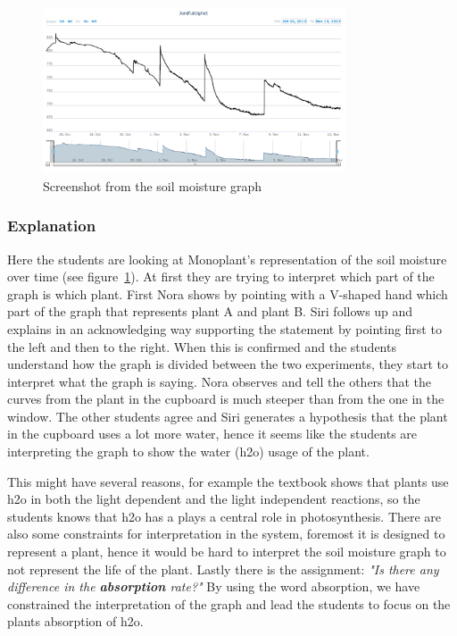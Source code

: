 \begin{figure}
	\centering
	\includegraphics[width=0.8\textwidth]{img/dataandanalasys/soilmoisturegraph.png}
	\caption{Screenshot from the soil moisture graph}
	\label{fig:soilmoistscreenshot}
\end{figure}

\subsubsection*{Explanation}
Here the students are looking at Monoplant's representation of the soil moisture over time (see figure~\ref{fig:soilmoistscreenshot}). At first they are trying to interpret which part of the graph is which plant. First Nora shows by pointing with a V-shaped hand which part of the graph that represents plant A and plant B. Siri follows up and explains in an acknowledging way supporting the statement by pointing first to the left and then to the right. When this is confirmed and the students understand how the graph is divided between the two experiments, they start to interpret what the graph is saying. Nora observes and tell the others that the curves from the plant in the cupboard is much steeper than from the one in the window. The other students agree and Siri generates a hypothesis that the plant in the cupboard uses a lot more water, hence it seems like the students are interpreting the graph to show the water (h2o) usage of the plant. 

This might have several reasons, for example the textbook shows that plants use h2o in both the light dependent and the light independent reactions, so the students knows that h2o has a plays a central role in photosynthesis. There are also some constraints for interpretation in the system, foremost it is designed to represent a plant, hence it would be hard to interpret the soil moisture graph to not represent the life of the plant. Lastly there is the assignment: \emph{"Is there any difference in the \textbf{absorption} rate?"} By using the word absorption, we have constrained the interpretation of the graph and lead the students to focus on the plants absorption of h2o.

